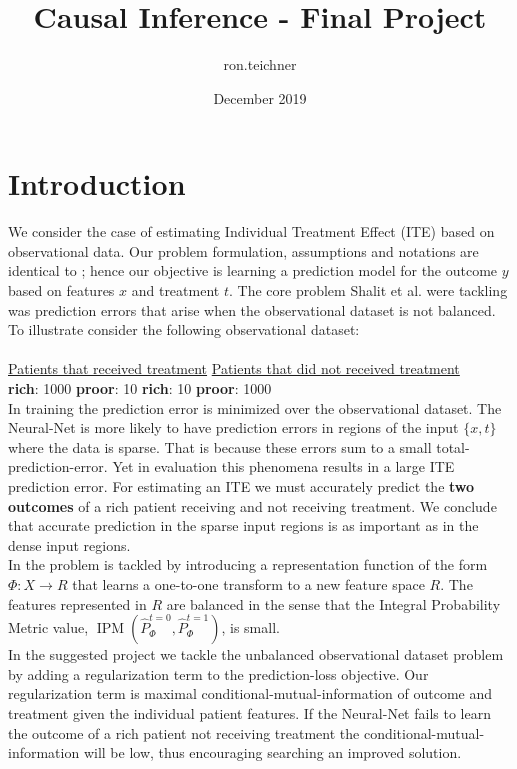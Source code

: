 \documentclass[oneside,12pt]{article}
\title{Causal Inference - Final Project}
\author{ron.teichner }
\date{December 2019}
\begin{document}
%
\maketitle
%
\section*{Introduction}\label{sec:intro}
%
We consider the case of estimating Individual Treatment Effect (ITE) based on observational data. Our problem formulation, assumptions and notations are identical to \cite{pmlr-v70-shalit17a}; hence our objective is learning a prediction model for the outcome $y$ based on features $x$ and treatment $t$. The core problem Shalit et al. were tackling was prediction errors that arise when the observational dataset is not balanced. To illustrate consider the following observational dataset:\\\\
%
\underline{Patients that received treatment} \quad \quad \quad \underline{Patients that did not received treatment}\\
\textbf{rich}: 1000 \quad \textbf{proor}: 10 \quad \quad \quad \quad \quad \quad \quad \textbf{rich}: 10 \quad \textbf{proor}: 1000\\

In training the prediction error is minimized over the observational dataset. The Neural-Net is more likely to have prediction errors in regions of the input $\{x,t\}$ where the data is sparse. That is because these errors sum to a small total-prediction-error. Yet in evaluation this phenomena results in a large ITE prediction error. For estimating an ITE we must accurately predict the \textbf{two outcomes} of a rich patient receiving and not receiving treatment. We conclude that accurate prediction in the sparse input regions is as important as in the dense input regions.\\

In \cite{pmlr-v70-shalit17a} the problem is tackled by introducing a representation function of the form $\Phi: X \rightarrow R$ that learns a one-to-one transform to a new feature space $R$. The features represented in $R$ are balanced in the sense that the Integral Probability Metric value, $\operatorname{IPM}(\hat{P}^{t=0}_\Phi, \hat{P}^{t=1}_\Phi)$, is small.\\

In the suggested project we tackle the unbalanced observational dataset problem by adding a regularization term to the prediction-loss objective. Our regularization term is maximal conditional-mutual-information of outcome and treatment given the individual patient features. If the Neural-Net fails to learn the outcome of a rich patient not receiving treatment the conditional-mutual-information will be low, thus encouraging searching an improved solution.  
%
\end{document}
